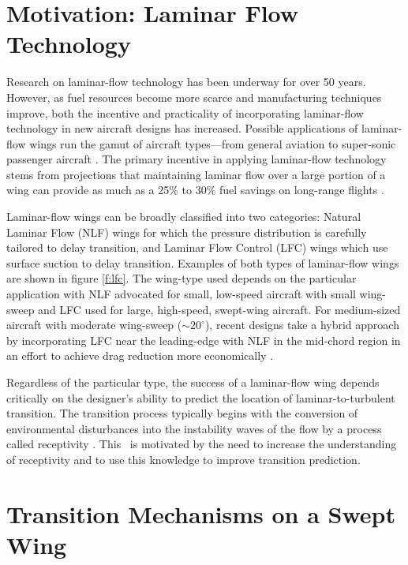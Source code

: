 \section{Motivation: Laminar Flow Technology \label{s:motive}}

Research on laminar-flow technology has been underway for over 50 years.
However, as fuel resources become more scarce and manufacturing techniques
improve, both the incentive and practicality of incorporating laminar-flow
technology in new aircraft designs has increased.  Possible applications of
laminar-flow wings run the gamut of aircraft types---from general aviation to
super-sonic passenger aircraft \cite{BrMaBaWaCo:90}.  The primary incentive in
applying laminar-flow technology stems from projections that maintaining
laminar flow over a large portion of a wing can provide as much as a 25\% to
30\% fuel savings on long-range flights \cite{ReHoKoQu:86}.

Laminar-flow wings can be broadly classified into two categories:
Natural Laminar Flow (NLF) wings for which the pressure distribution is
carefully tailored to delay transition, and Laminar Flow Control (LFC) wings
which use surface suction to delay transition.  Examples of both types of
laminar-flow wings are shown in figure \ref{f:lfc}. The wing-type used depends
on the particular application with NLF advocated for small, low-speed aircraft
with small wing-sweep and LFC used for large, high-speed, swept-wing aircraft.
For medium-sized aircraft with moderate wing-sweep ($\sim 20^\circ$), recent
designs take a hybrid approach by incorporating LFC near the leading-edge with
NLF in the mid-chord region in an effort to achieve drag reduction more
economically \cite{BrMaBaWaCo:90}.

Regardless of the particular type, the success of a laminar-flow wing depends
critically on the designer's ability to predict the location of
laminar-to-turbulent transition.  The transition process typically begins with
the conversion of environmental disturbances into the instability waves of the
flow by a process called receptivity \cite{Morkovin:69}.  This \thesis\ is
motivated by the need to increase the understanding of receptivity and to use
this knowledge to improve transition prediction.

\section{Transition Mechanisms on a Swept Wing \label{s:transition}}

